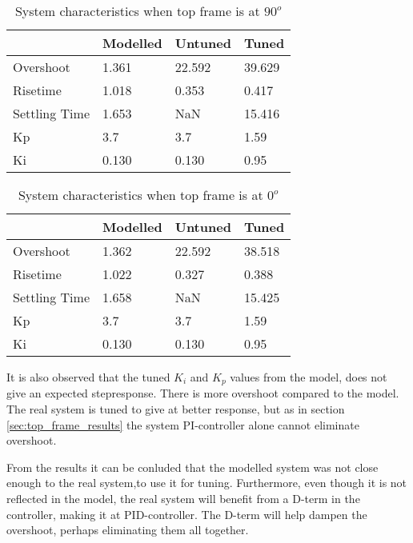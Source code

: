 \documentclass[../../Main]{subfiles}
\begin{document}
\begin{table}[H]
	\centering
	\begin{tabular}{l|*{3}{l}}
		&Modelled&Untuned&Tuned\\
		\hline
		Overshoot&1.361&22.592&39.629\\
		Risetime& 1.018&0.353&0.417\\
		Settling Time& 1.653&NaN& 15.416\\
		Kp&3.7&3.7&1.59\\
		Ki&0.130&0.130&0.95
	\end{tabular}
	\caption{System characteristics when top frame is at $90^o$}
	\label{tab:90_bot}
\end{table}

\begin{table}[H]
	\centering
	\begin{tabular}{l|*{3}{l}}
		&Modelled&Untuned&Tuned\\
		\hline
		Overshoot&1.362&22.592&38.518\\
		Risetime&1.022&0.327&0.388\\
		Settling Time&1.658&NaN&15.425\\
		Kp&3.7&3.7&1.59\\
		Ki&0.130&0.130&0.95
	\end{tabular}
	\caption{System characteristics when top frame is at $0^o$}
	\label{tab:0_bot}
\end{table}

It is also observed that the tuned $K_i$ and $K_p$ values from the model, does not give an expected stepresponse. There is more overshoot compared to the model. The real system is tuned to give at better response, but as in section \ref{sec:top_frame_results} the system PI-controller alone cannot eliminate overshoot.

From the results it can be conluded that the modelled system was not close enough to the real system,to use it for tuning. Furthermore, even though it is not reflected in the model, the real system will benefit from a D-term in the controller, making it at PID-controller. The D-term will help dampen the overshoot, perhaps eliminating them all together. 
\end{document}
